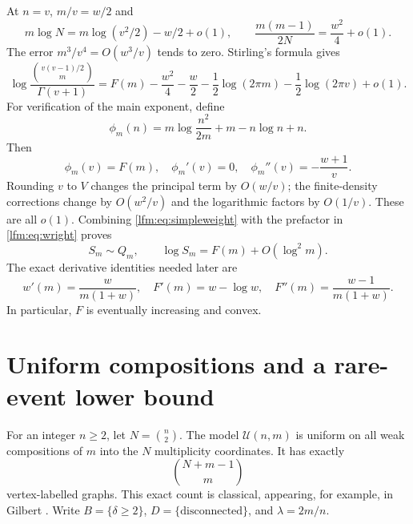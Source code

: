 \documentclass[11pt,letterpaper]{article}
\theoremstyle{remark}\newtheorem{remark}[theorem]{Remark}
\newcommand{\U}{\mathcal U}\newcommand{\dd}{\,\mathrm d}
\begin{document}
At $n=v$, $m/v=w/2$ and
\[
 m\log N=m\log(v^2/2)-w/2+o(1),\qquad
 \frac{m(m-1)}{2N}=\frac{w^2}{4}+o(1).
\]
The error $m^3/v^4=O(w^3/v)$ tends to zero. Stirling's formula gives
\begin{equation}
 \log\frac{\binom{v(v-1)/2}{m}}{\Gamma(v+1)}
 =F(m)-\frac{w^2}{4}-\frac w2
 -\frac12\log(2\pi m)-\frac12\log(2\pi v)+o(1).\label{lfm:eq:simpleweight}
\end{equation}
For verification of the main exponent, define
\begin{equation}
 \phi_m(n)=m\log\frac{n^2}{2m}+m-n\log n+n.\label{lfm:eq:phi}
\end{equation}
Then
\[
 \phi_m(v)=F(m),\quad \phi_m'(v)=0,\quad
 \phi_m''(v)=-\frac{w+1}{v}.
\]
Rounding $v$ to $V$ changes the principal term by $O(w/v)$; the finite-density corrections change by $O(w^2/v)$ and the logarithmic factors by $O(1/v)$. These are all $o(1)$. Combining \eqref{lfm:eq:simpleweight} with the prefactor in \eqref{lfm:eq:wright} proves
\begin{equation}
 S_m\sim Q_m,\qquad \log S_m=F(m)+O(\log^2m).\label{lfm:eq:S}
\end{equation}
The exact derivative identities needed later are
\begin{equation}
 w'(m)=\frac{w}{m(1+w)},\quad
 F'(m)=w-\log w,\quad
 F''(m)=\frac{w-1}{m(1+w)}.\label{lfm:eq:Fderiv}
\end{equation}
In particular, $F$ is eventually increasing and convex.

\section{Uniform compositions and a rare-event lower bound}\label{lfm:sec:compositions}
For an integer $n\ge2$, let $N=\binom n2$. The model $\U(n,m)$ is uniform on all weak compositions of $m$ into the $N$ multiplicity coordinates. It has exactly
\begin{equation}
 \binom{N+m-1}{m}\label{lfm:eq:weakcount}
\end{equation}
vertex-labelled graphs. This exact count is classical, appearing, for example, in Gilbert \cite{gilbert}. Write $B=\{\delta\ge2\}$, $D=\{\text{disconnected}\}$, and $\lambda=2m/n$.
\end{document}
